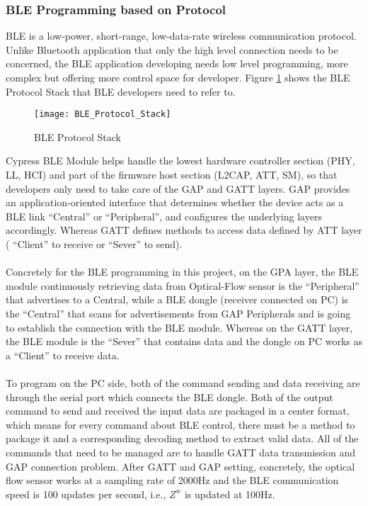 \subsubsection{BLE Programming based on Protocol}
%
BLE is a low-power, short-range, low-data-rate wireless communication protocol. Unlike Bluetooth application that only the high level connection needs to be concerned, the BLE application developing needs low level programming, more complex but offering more control space for developer. Figure \ref{BLE_Protocol_Stack} shows the BLE Protocol Stack that BLE developers need to refer to.
%
\begin{figure}[H]
\centering
\texttt{[image: BLE\_Protocol\_Stack]}
\caption{BLE Protocol Stack}
\label{BLE_Protocol_Stack}
\end{figure}%
%
Cypress BLE Module helps handle the lowest hardware controller section (PHY, LL, HCI) and part of the firmware host section (L2CAP, ATT, SM), so that developers only need to take care of the GAP and GATT layers. GAP provides an application-oriented interface that determines whether the device acts as a BLE link \enquote{Central} or \enquote{Peripheral}, and configures the underlying layers accordingly. Whereas GATT defines methods to access data defined by ATT layer ( \enquote{Client} to receive or \enquote{Sever} to send).
\\\\%
Concretely for the BLE programming in this project, on the GPA layer, the BLE module continuously retrieving data from Optical-Flow sensor is the \enquote{Peripheral} that advertises to a Central, while a BLE dongle (receiver connected on PC) is the \enquote{Central} that scans for advertisements from GAP Peripherals and is going to establish the connection with the BLE module. Whereas on the GATT layer, the BLE module is the \enquote{Sever} that contains data and the dongle on PC works as a \enquote{Client} to receive data.
\\\\%
To program on the PC side, both of the command sending and data receiving are through the serial port which connects the BLE dongle. Both of the output command to send and received the input data are packaged in a center format, which means for every command about BLE control, there must be a method to package it and a corresponding decoding method to extract valid data. All of the commands that need to be managed are to handle GATT data transmission and GAP connection problem. After GATT and GAP setting, concretely, the optical flow sensor works at a sampling rate of 2000Hz and the BLE communication speed is 100 updates per second, i.e., \(Z^w\) is updated at 100Hz.
%
%
